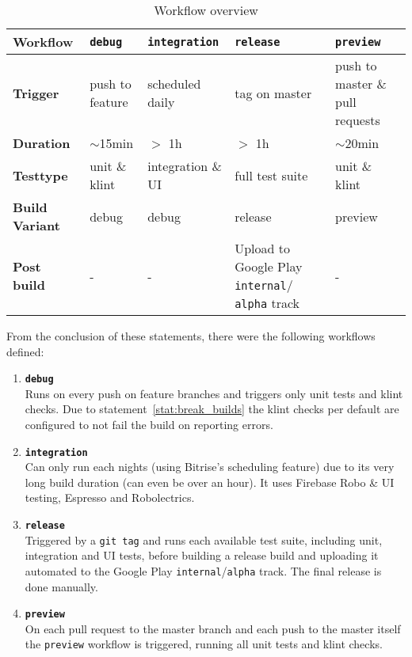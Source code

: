 \begin{table}[htb]
	\renewcommand{\arraystretch}{1.3}
	\caption{Workflow overview}
	\label{tab:overview_workflows}
	\centering
	\begin{tabular}{|p{31pt}||p{45pt}|p{50pt}|p{45pt}|p{45pt}|}
		\hline
		\textbf{Workflow} & \textbf{\texttt{debug}} & \textbf{\texttt{integration}} & \textbf{\texttt{release}} & \textbf{\texttt{preview}} \\ \hline \hline
		\textbf{Trigger} & push to feature & scheduled daily & tag on master & push to master \& pull requests \\ \hline
		\textbf{Duration} & $\sim$15min & $>$ 1h & $>$ 1h & $\sim$20min \\ \hline
		\textbf{Testtype} & unit \& klint & integration \& UI & full test suite & unit \& klint \\ \hline
		\textbf{Build Variant} & debug & debug & release & preview \\ \hline
		\textbf{Post build} & - & - & Upload to Google Play \texttt{internal}/ \texttt{alpha} track & - \\ \hline
	\end{tabular}
\end{table}

From the conclusion of these statements, there were the following workflows defined:

\begin{enumerate}
	\item \textbf{\texttt{debug}}\\
	Runs on every push on feature branches and triggers only unit tests and klint checks. Due to statement~\ref{stat:break_builds} the klint checks per default are configured to not fail the build on reporting errors.
	\item \textbf{\texttt{integration}}\\
	Can only run each nights (using Bitrise's scheduling feature) due to its very long build duration (can even be over an hour). It uses Firebase Robo \& UI testing, Espresso and Robolectrics.
	\item \textbf{\texttt{release}}\\
	Triggered by a \texttt{git tag} and runs each available test suite, including unit, integration and UI tests, before building a release build and uploading it automated to the Google Play \texttt{internal}/\texttt{alpha} track. The final release is done manually.
	\item \textbf{\texttt{preview}}\\
	On each pull request to the master branch and each push to the master itself the \texttt{preview} workflow is triggered, running all unit tests and klint checks.
\end{enumerate}

